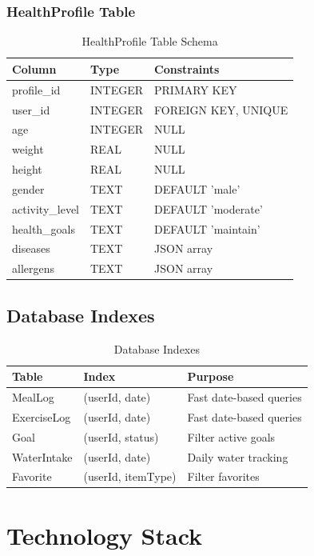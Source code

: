 \subsubsection{HealthProfile Table}

\begin{table}[H]
\centering
\begin{tabular}{|l|l|l|}
\hline
\textbf{Column} & \textbf{Type} & \textbf{Constraints} \\
\hline
profile\_id & INTEGER & PRIMARY KEY \\
user\_id & INTEGER & FOREIGN KEY, UNIQUE \\
age & INTEGER & NULL \\
weight & REAL & NULL \\
height & REAL & NULL \\
gender & TEXT & DEFAULT 'male' \\
activity\_level & TEXT & DEFAULT 'moderate' \\
health\_goals & TEXT & DEFAULT 'maintain' \\
diseases & TEXT & JSON array \\
allergens & TEXT & JSON array \\
\hline
\end{tabular}
\caption{HealthProfile Table Schema}
\end{table}

\subsection{Database Indexes}

\begin{table}[H]
\centering
\begin{tabular}{|l|l|p{6cm}|}
\hline
\textbf{Table} & \textbf{Index} & \textbf{Purpose} \\
\hline
MealLog & (userId, date) & Fast date-based queries \\
ExerciseLog & (userId, date) & Fast date-based queries \\
Goal & (userId, status) & Filter active goals \\
WaterIntake & (userId, date) & Daily water tracking \\
Favorite & (userId, itemType) & Filter favorites \\
\hline
\end{tabular}
\caption{Database Indexes}
\end{table}

\section{Technology Stack}


